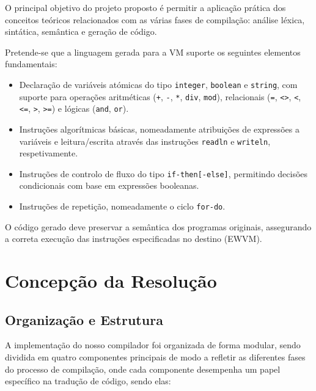 \documentclass[12pt,a4paper]{report}%
\begin{document}
O principal objetivo do projeto proposto é permitir a aplicação prática dos conceitos teóricos relacionados com as várias fases de compilação: análise léxica, sintática, semântica e geração de código.

Pretende-se que a linguagem gerada para a VM suporte os seguintes elementos fundamentais:

\begin{itemize}
    \item Declaração de variáveis atómicas do tipo \texttt{integer}, \texttt{boolean} e \texttt{string}, com suporte para operações aritméticas (\texttt{+}, \texttt{-}, \texttt{*}, \texttt{div}, \texttt{mod}), relacionais (\texttt{=}, \texttt{<>}, \texttt{<}, \texttt{<=}, \texttt{>}, \texttt{>=}) e lógicas (\texttt{and}, \texttt{or}).
    
    \item Instruções algorítmicas básicas, nomeadamente atribuições de expressões a variáveis e leitura/escrita através das instruções \texttt{readln} e \texttt{writeln}, respetivamente.
    
    \item Instruções de controlo de fluxo do tipo \texttt{if-then[-else]}, permitindo decisões condicionais com base em expressões booleanas.
    
    \item Instruções de repetição, nomeadamente o ciclo \texttt{for-do}.
\end{itemize}
 
O código gerado deve preservar a semântica dos programas originais, assegurando a correta execução das instruções especificadas no destino (EWVM).

\chapter{Concepção da Resolução}
\section{Organização e Estrutura}

A implementação do nosso compilador foi organizada de forma modular, sendo dividida em quatro componentes principais de modo a refletir as diferentes fases do processo de compilação, onde cada componente desempenha um papel específico na tradução de código, sendo elas:
\end{document}
